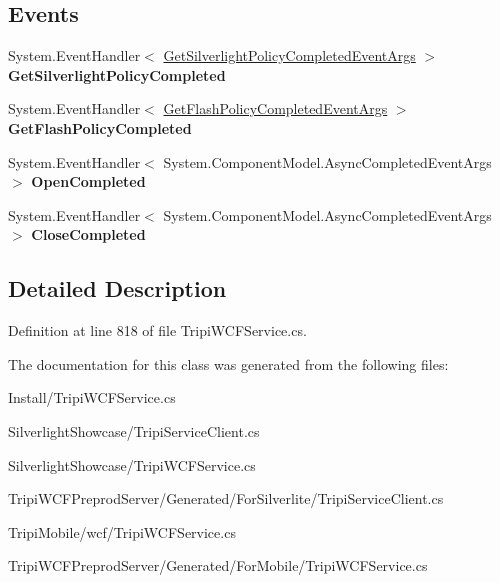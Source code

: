 \subsection*{Events}
\begin{DoxyCompactItemize}
\item 
\hypertarget{class_cross_domain_policy_responder_client_a6c58c7a84350621098910ed73c132f09}{
System.EventHandler$<$ \hyperlink{class_get_silverlight_policy_completed_event_args}{GetSilverlightPolicyCompletedEventArgs} $>$ {\bfseries GetSilverlightPolicyCompleted}}
\label{class_cross_domain_policy_responder_client_a6c58c7a84350621098910ed73c132f09}

\item 
\hypertarget{class_cross_domain_policy_responder_client_a442f0f344cb0127abb00b33bb96748b9}{
System.EventHandler$<$ \hyperlink{class_get_flash_policy_completed_event_args}{GetFlashPolicyCompletedEventArgs} $>$ {\bfseries GetFlashPolicyCompleted}}
\label{class_cross_domain_policy_responder_client_a442f0f344cb0127abb00b33bb96748b9}

\item 
\hypertarget{class_cross_domain_policy_responder_client_a2c394b07dc4e30552e316d11a615b558}{
System.EventHandler$<$ System.ComponentModel.AsyncCompletedEventArgs $>$ {\bfseries OpenCompleted}}
\label{class_cross_domain_policy_responder_client_a2c394b07dc4e30552e316d11a615b558}

\item 
\hypertarget{class_cross_domain_policy_responder_client_a1d2b052ca8e31005973db06c65fb9ef6}{
System.EventHandler$<$ System.ComponentModel.AsyncCompletedEventArgs $>$ {\bfseries CloseCompleted}}
\label{class_cross_domain_policy_responder_client_a1d2b052ca8e31005973db06c65fb9ef6}

\end{DoxyCompactItemize}


\subsection{Detailed Description}


Definition at line 818 of file TripiWCFService.cs.

The documentation for this class was generated from the following files:\begin{DoxyCompactItemize}
\item 
Install/TripiWCFService.cs\item 
SilverlightShowcase/TripiServiceClient.cs\item 
SilverlightShowcase/TripiWCFService.cs\item 
TripiWCFPreprodServer/Generated/ForSilverlite/TripiServiceClient.cs\item 
TripiMobile/wcf/TripiWCFService.cs\item 
TripiWCFPreprodServer/Generated/ForMobile/TripiWCFService.cs\end{DoxyCompactItemize}
